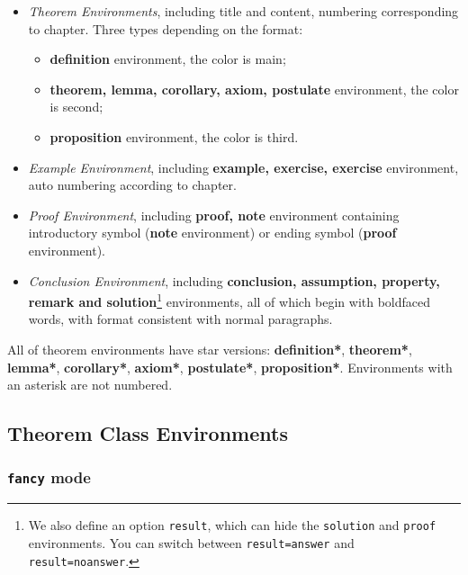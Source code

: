 \documentclass[11pt]{elegantbook}
\begin{document}
\begin{itemize}
\item \textit{Theorem Environments}, including title and content, numbering corresponding to chapter. Three types depending on the format:
   \begin{itemize}
      \item \textcolor{main}{\textbf{definition}} environment, the color is  \textcolor{main}{main};
      \item \textcolor{second}{\textbf{theorem, lemma, corollary, axiom, postulate}} environment, the color is \textcolor{second} {second};
      \item \textcolor{third}{\textbf{proposition}} environment, the color is \textcolor{third}{third}.
   \end{itemize}
\item \textit{Example Environment}, including \textbf{example, exercise, exercise} environment, auto numbering according to chapter.
\item \textit{Proof Environment}, including \textbf{proof, note} environment containing introductory symbol (\textbf{note} environment) or ending symbol (\textbf{proof} environment).
\item \textit{Conclusion Environment}, including \textbf{conclusion, assumption, property, remark and solution}\footnote{We also define an option \lstinline{result}, which can hide the \lstinline{solution} and \lstinline{proof} environments. You can switch between \lstinline{result=answer} and \lstinline{result=noanswer}.} environments, all of which begin with boldfaced words, with format consistent with normal paragraphs.
\end{itemize}

All of theorem environments have star versions: \textcolor{main}{\textbf{definition*}}, \textcolor{second}{\textbf{theorem*}}, \textcolor{second}{\textbf{lemma*}}, \textcolor{second}{\textbf{corollary*}}, \textcolor{second}{\textbf{axiom*}}, \textcolor{second}{\textbf{postulate*}}, \textcolor{third}{\textbf{proposition*}}. Environments with an asterisk are not numbered.

\subsection{Theorem Class Environments}

\subsubsection{\lstinline{fancy} mode}
\end{document}
